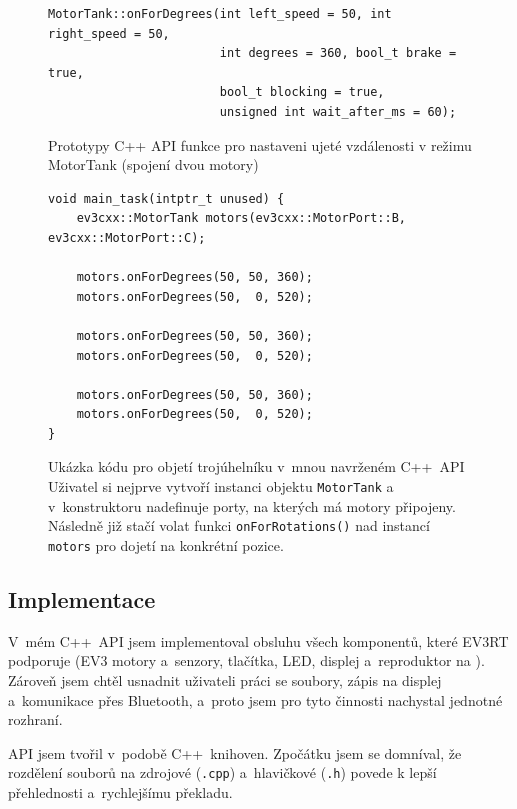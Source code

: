 \begin{figure}[H] 
    \begin{verbatim}
MotorTank::onForDegrees(int left_speed = 50, int right_speed = 50, 
                        int degrees = 360, bool_t brake = true, 
                        bool_t blocking = true, 
                        unsigned int wait_after_ms = 60);
    \end{verbatim}
    \caption[Prototypy C++ API funkce pro nastaveni ujeté vzdálenosti v režimu MotorTank]{Prototypy C++ API funkce pro nastaveni ujeté vzdálenosti v režimu MotorTank (spojení dvou motory)}
    \label{src:ev3cxx_motor-rotate}
\end{figure}
\begin{figure}[H] 
    \begin{verbatim}
void main_task(intptr_t unused) {    
    ev3cxx::MotorTank motors(ev3cxx::MotorPort::B, ev3cxx::MotorPort::C);   
    
    motors.onForDegrees(50, 50, 360);
    motors.onForDegrees(50,  0, 520);

    motors.onForDegrees(50, 50, 360);
    motors.onForDegrees(50,  0, 520); 

    motors.onForDegrees(50, 50, 360);
    motors.onForDegrees(50,  0, 520);
}
    \end{verbatim}
    \caption[Ukázka kódu pro objetí trojúhelníku v~mnou navrženém C++~API]{Ukázka kódu pro objetí trojúhelníku v~mnou navrženém C++~API \\
    Uživatel si nejprve vytvoří instanci objektu \texttt{MotorTank} a v~konstruktoru nadefinuje porty, na kterých má motory připojeny. 
    Následně již stačí volat funkci \texttt{onForRotations()} nad instancí \texttt{motors} pro dojetí na konkrétní pozice.    
    }
    \label{src:ev3cxx-triangle}
\end{figure}

\subsection{Implementace}


V~mém C++~API jsem implementoval obsluhu všech komponentů, které EV3RT podporuje (EV3 motory a~senzory, tlačítka, LED, displej a~reproduktor na ).
Zároveň jsem chtěl usnadnit uživateli práci se soubory, zápis na displej a~komunikace přes Bluetooth, a~proto jsem pro tyto činnosti nachystal  jednotné rozhraní.

API jsem tvořil v~podobě C++~knihoven. 
Zpočátku jsem se domníval, že rozdělení souborů na zdrojové (\texttt{.cpp}) a~hlavičkové (\texttt{.h}) povede k lepší přehlednosti a~rychlejšímu překladu.

